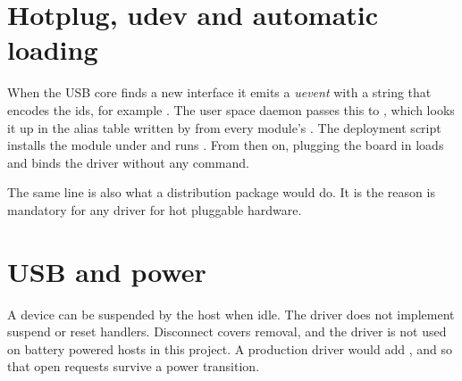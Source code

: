 \section{Hotplug, udev and automatic loading}

When the USB core finds a new interface it emits a \emph{uevent} with a  string that encodes the ids, for example . The user space daemon  passes this to , which looks it up in the alias table written by  from every module's . The deployment script installs the module under  and runs . From then on, plugging the board in loads and binds the driver without any command.

The same  line is also what a distribution package would do. It is the reason  is mandatory for any driver for hot pluggable hardware.

\section{USB and power}

A device can be suspended by the host when idle. The driver does not implement suspend or reset handlers. Disconnect covers removal, and the driver is not used on battery powered hosts in this project. A production driver would add ,  and  so that open requests survive a power transition.

